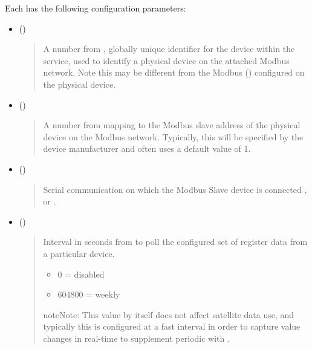 \documentclass[letterpaper,10pt,english]{sphinxmanual}
\begin{document}
Each  has the following configuration parameters:
\begin{itemize}
\item {} 
 ()
\begin{quote}

A number from , globally unique identifier for the device within the service, used to identify a physical device on the attached Modbus network.
Note this may be different from the Modbus  () configured on the physical device.
\end{quote}

\item {} 
 ()
\begin{quote}

A number from  mapping to the Modbus slave address of the physical device on the Modbus network.
Typically, this will be specified by the device manufacturer and often uses a default value of 1.
\end{quote}

\item {} 
 ()
\begin{quote}

Serial communication  on which the Modbus Slave device is connected ,  or .
\end{quote}

\item {} 
 ()
\begin{quote}

Interval in seconds from  to poll the configured set of register data from a particular device.
\begin{itemize}
\item {} 
0 = disabled

\item {} 
604800 = weekly

\end{itemize}

\begin{sphinxadmonition}{note}{Note:}
This value by itself does not affect satellite data use, and typically this is configured at a fast interval in order to capture value changes in real-time to supplement periodic  with .
\end{sphinxadmonition}
\end{quote}


\end{itemize}
\end{document}
